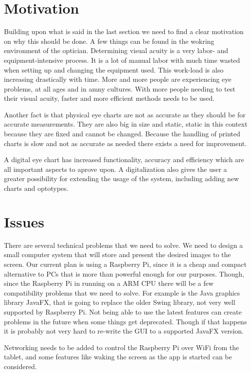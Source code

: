\documentclass[12pt,a4paper,notitlepage]{report}
\begin{document}
\section{Motivation}
Building upon what is said in the last section we need to find a clear motivation on why this should be done. A few things can be found in the wokring environment of the optician. Determining visual acuity is a very labor- and equipment-intensive process. It is a lot of manual labor with much time wasted when setting up and changing the equipment used. This work-load is also increasing drastically with time. More and more people are experiencing eye problems, at all ages and in amny cultures. \cite{vision_loss} With more people needing to test their visual acuity, faster and more efficient methods needs to be used. 

Another fact is that physical eye charts are not as accurate as they should be for accurate measurements. They are also big in size and static, static in this context because they are fixed and cannot be changed. Because the handling of printed charts is slow and not as accurate as needed there exists a need for improvement. 

A digital eye chart has increased functionality, accuracy and efficiency which are all important aspects to aprove upon. A digitalization also gives the user a greater possibility for extending the usage of the system, including adding new charts and optotypes. 

\section{Issues}
There are several technical problems that we need to solve. We need to design a small computer system that will store and present the desired images to the screen. Our current plan is using a Raspberry Pi, since it is a cheap and compact alternative to PCs that is more than powerful enough for our purposes. Though, since the Raspberry Pi in running on a ARM CPU there will be a few compatibility problems that we need to solve. For example is the Java graphics library JavaFX, that is going to replace the older Swing library, not very well supported by Raspberry Pi. Not being able to use the latest features can create problems in the future when some things get deprecated. Though if that happens it is probably not very hard to re-write the GUI to a supported JavaFX version.

Networking needs to be added to control the Raspberry Pi over WiFi from the tablet, and some features like waking the screen as the app is started can be considered. 
\end{document}
